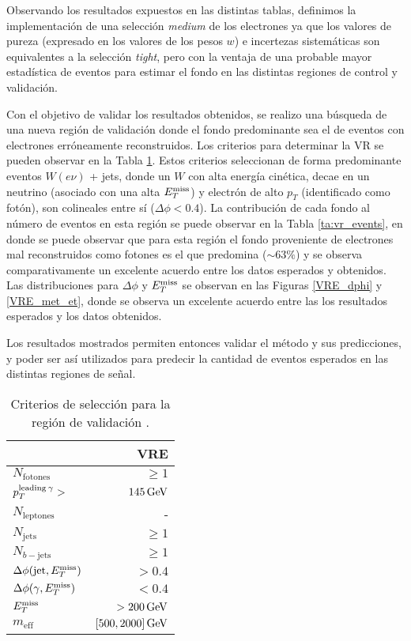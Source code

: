 Observando los resultados expuestos en las distintas tablas, definimos la implementación de una selección \textit{medium} de los electrones ya que los valores de pureza (expresado en los valores de los pesos $w$) e incertezas sistemáticas son equivalentes a la selección \textit{tight}, pero con la ventaja de una probable mayor estadística de eventos para estimar el fondo en las distintas regiones de control y validación.


Con el objetivo de validar los resultados obtenidos, se realizo una búsqueda de una nueva región de validación donde el fondo predominante sea el de eventos con electrones erróneamente reconstruidos. Los criterios para determinar la VR se pueden observar en la Tabla \ref{ta:vr_crit}. Estos criterios seleccionan de forma predominante eventos $W(e\nu)$ + jets, donde un $W$ con alta energía cinética, decae en un neutrino (asociado con una alta $E_{T}^{\text{miss}}$) y electrón de alto $p_{T}$ (identificado como fotón), son colineales entre sí ($\Delta\phi<0.4$). La contribución de cada fondo al número de eventos en esta región se puede observar en la Tabla \ref{ta:vr_events}, en donde se puede observar que para esta región el fondo proveniente de electrones mal reconstruidos como fotones es el que predomina ($\sim63\%$) y se observa comparativamente un excelente acuerdo entre los datos esperados y obtenidos. Las distribuciones para $\Delta \phi$ y $E_{T}^{\text{miss}}$ se observan en las Figuras \ref{VRE_dphi} y \ref{VRE_met_et}, donde se observa un excelente acuerdo entre las los resultados esperados y los datos obtenidos.

Los resultados mostrados permiten entonces validar el método y sus predicciones, y poder ser así utilizados para predecir la cantidad de eventos esperados en las distintas regiones de señal.

\begin{table}
\centering
\caption{Criterios de selección para la región de validación \cite{drfran}.}
  \begin{tabular}{l|r}
  \hline
  \hline
  & VRE \\
  \hline
  $N_{\mathrm{fotones}}$                  &       $\ge1$  \\
  $p_{ T}^{\text{leading}\: \gamma} >$         &    $145\, \mathrm{GeV}$  \\
  $N_{\mathrm{leptones}}$                  &           -   \\
  $N_{\mathrm{jets}}$                     &       $\ge1$  \\
  $N_{b-\mathrm{jets}}$                   &       $\ge1$  \\
  $\Delta\phi(\text{jet}, E_{T}^{\text{miss}})$          &       $>0.4$  \\
  $\Delta\phi(\gamma, E_{T}^{\text{miss}})$                &       $<0.4$  \\
  ${E_{T}^{\text{miss}}}$                                &   $>200\, \mathrm{GeV}$  \\
  $m_{\text{eff}}$                               &  $[500, 2000]\, \mathrm{GeV}$  \\
  \hline
  \hline
\end{tabular}
\label{ta:vr_crit}
\end{table}

